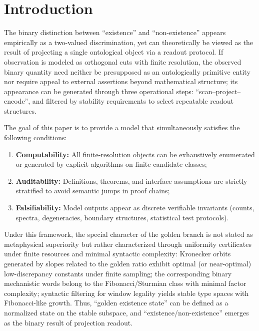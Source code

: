 \section{Introduction}

The binary distinction between ``existence'' and ``non-existence'' appears empirically as a two-valued discrimination, yet can theoretically be viewed as the result of projecting a single ontological object via a readout protocol. If observation is modeled as orthogonal cuts with finite resolution, the observed binary quantity need neither be presupposed as an ontologically primitive entity nor require appeal to external assertions beyond mathematical structure; its appearance can be generated through three operational steps: ``scan--project--encode'', and filtered by stability requirements to select repeatable readout structures.

The goal of this paper is to provide a model that simultaneously satisfies the following conditions:
\begin{enumerate}
  \item \textbf{Computability:} All finite-resolution objects can be exhaustively enumerated or generated by explicit algorithms on finite candidate classes;
  \item \textbf{Auditability:} Definitions, theorems, and interface assumptions are strictly stratified to avoid semantic jumps in proof chains;
  \item \textbf{Falsifiability:} Model outputs appear as discrete verifiable invariants (counts, spectra, degeneracies, boundary structures, statistical test protocols).
\end{enumerate}

Under this framework, the special character of the golden branch is not stated as metaphysical superiority but rather characterized through uniformity certificates under finite resources and minimal syntactic complexity: Kronecker orbits generated by slopes related to the golden ratio exhibit optimal (or near-optimal) low-discrepancy constants under finite sampling; the corresponding binary mechanistic words belong to the Fibonacci/Sturmian class with minimal factor complexity; syntactic filtering for window legality yields stable type spaces with Fibonacci-like growth. Thus, ``golden existence state'' can be defined as a normalized state on the stable subspace, and ``existence/non-existence'' emerges as the binary result of projection readout.
